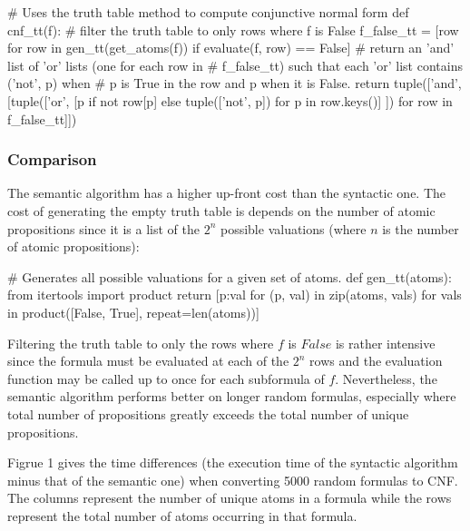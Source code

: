 \documentclass[a4paper,notitlepage]{scrartcl}
\begin{document}
\begin{code}
# Uses the truth table method to compute conjunctive normal form
def cnf_tt(f):
    # filter the truth table to only rows where f is False 
    f_false_tt = [row for row in gen_tt(get_atoms(f)) 
                  if evaluate(f, row) == False]
    # return an 'and' list of 'or' lists (one for each row in
    # f_false_tt) such that each 'or' list contains ('not', p) when
    # p is True in the row and p when it is False.
    return tuple(['and', [tuple(['or', 
        [p if not row[p] else tuple(['not', p]) for p in row.keys()] ]) 
        for row in f_false_tt]])
\end{code}

\subsubsection{Comparison}

The semantic algorithm has a higher up-front cost than the syntactic one.
The cost of generating the empty truth table is depends on the number of
   atomic propositions since 
it is a list of the $2^n$ possible valuations (where $n$ is the
        number of atomic propositions):
\begin{code}
# Generates all possible valuations for a given set of atoms.     
def gen_tt(atoms):
    from itertools import product
    return [{p:val for (p, val) in zip(atoms, vals)} for vals in 
         product([False, True], repeat=len(atoms))]
\end{code}
Filtering the truth table to only the rows where $f$ is $False$ is rather
        intensive since the formula must be evaluated at each of the
        $2^n$ rows and the evaluation function may be called up to once
        for each subformula of $f$.
Nevertheless, the semantic algorithm performs better on longer random formulas,
	especially 
        where total number of propositions greatly exceeds the total number of
        unique propositions. 

Figrue 1 gives the time differences (the execution time of the
syntactic algorithm minus that of the semantic one) when converting 5000 random
formulas to CNF.
The columns represent the number of unique atoms in a formula while the rows
represent the total number of atoms occurring in that formula.
\end{document}
